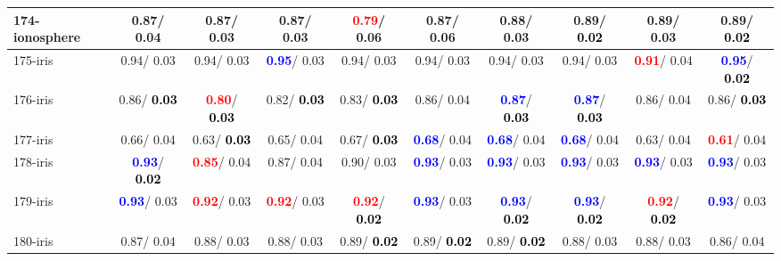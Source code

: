 \begin{table}[h]
\begin{center}
{\begin{tabular}{lc|c|c|c|c|c|c|c|c}
174-ionosphere &   0.87/  0.04 &   0.87/  0.03 &   0.87/  0.03 & \textcolor{red}{\textbf{  0.79}}/  0.06 &   0.87/  0.06 &   0.88/  0.03 &   0.89/\textcolor{black}{\textbf{  0.02}} &   0.89/  0.03 &   0.89/\textcolor{black}{\textbf{  0.02}} \\ \hline
175-iris &   0.94/  0.03 &   0.94/  0.03 & \textcolor{blue}{\textbf{  0.95}}/  0.03 &   0.94/  0.03 &   0.94/  0.03 &   0.94/  0.03 &   0.94/  0.03 & \textcolor{red}{\textbf{  0.91}}/  0.04 & \textcolor{blue}{\textbf{  0.95}}/\textcolor{black}{\textbf{  0.02}} \\
176-iris &   0.86/\textcolor{black}{\textbf{  0.03}} & \textcolor{red}{\textbf{  0.80}}/\textcolor{black}{\textbf{  0.03}} &   0.82/\textcolor{black}{\textbf{  0.03}} &   0.83/\textcolor{black}{\textbf{  0.03}} &   0.86/  0.04 & \textcolor{blue}{\textbf{  0.87}}/\textcolor{black}{\textbf{  0.03}} & \textcolor{blue}{\textbf{  0.87}}/\textcolor{black}{\textbf{  0.03}} &   0.86/  0.04 &   0.86/\textcolor{black}{\textbf{  0.03}} \\
177-iris &   0.66/  0.04 &   0.63/\textcolor{black}{\textbf{  0.03}} &   0.65/  0.04 &   0.67/\textcolor{black}{\textbf{  0.03}} & \textcolor{blue}{\textbf{  0.68}}/  0.04 & \textcolor{blue}{\textbf{  0.68}}/  0.04 & \textcolor{blue}{\textbf{  0.68}}/  0.04 &   0.63/  0.04 & \textcolor{red}{\textbf{  0.61}}/  0.04 \\
178-iris & \textcolor{blue}{\textbf{  0.93}}/\textcolor{black}{\textbf{  0.02}} & \textcolor{red}{\textbf{  0.85}}/  0.04 &   0.87/  0.04 &   0.90/  0.03 & \textcolor{blue}{\textbf{  0.93}}/  0.03 & \textcolor{blue}{\textbf{  0.93}}/  0.03 & \textcolor{blue}{\textbf{  0.93}}/  0.03 & \textcolor{blue}{\textbf{  0.93}}/  0.03 & \textcolor{blue}{\textbf{  0.93}}/  0.03 \\
179-iris & \textcolor{blue}{\textbf{  0.93}}/  0.03 & \textcolor{red}{\textbf{  0.92}}/  0.03 & \textcolor{red}{\textbf{  0.92}}/  0.03 & \textcolor{red}{\textbf{  0.92}}/\textcolor{black}{\textbf{  0.02}} & \textcolor{blue}{\textbf{  0.93}}/  0.03 & \textcolor{blue}{\textbf{  0.93}}/\textcolor{black}{\textbf{  0.02}} & \textcolor{blue}{\textbf{  0.93}}/\textcolor{black}{\textbf{  0.02}} & \textcolor{red}{\textbf{  0.92}}/\textcolor{black}{\textbf{  0.02}} & \textcolor{blue}{\textbf{  0.93}}/  0.03 \\
180-iris &   0.87/  0.04 &   0.88/  0.03 &   0.88/  0.03 &   0.89/\textcolor{black}{\textbf{  0.02}} &   0.89/\textcolor{black}{\textbf{  0.02}} &   0.89/\textcolor{black}{\textbf{  0.02}} &   0.88/  0.03 &   0.88/  0.03 &   0.86/  0.04 \\

\end{tabular}}
\end{center}
\end{table}
